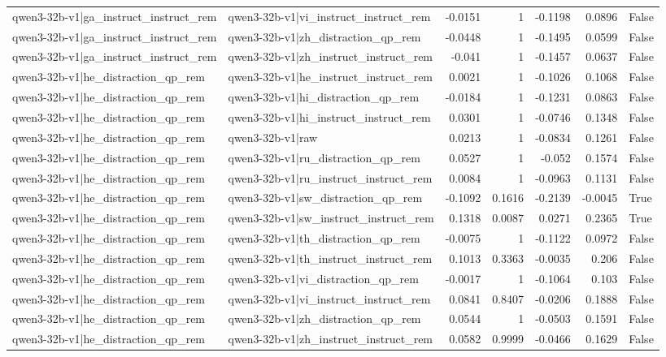 \begin{table}
\begin{tabular}{l l r r r r l}
qwen3-32b-v1|ga_instruct_instruct_rem & qwen3-32b-v1|vi_instruct_instruct_rem & -0.0151 & 1 & -0.1198 & 0.0896 & False \\
qwen3-32b-v1|ga_instruct_instruct_rem & qwen3-32b-v1|zh_distraction_qp_rem & -0.0448 & 1 & -0.1495 & 0.0599 & False \\
qwen3-32b-v1|ga_instruct_instruct_rem & qwen3-32b-v1|zh_instruct_instruct_rem & -0.041 & 1 & -0.1457 & 0.0637 & False \\
qwen3-32b-v1|he_distraction_qp_rem & qwen3-32b-v1|he_instruct_instruct_rem & 0.0021 & 1 & -0.1026 & 0.1068 & False \\
qwen3-32b-v1|he_distraction_qp_rem & qwen3-32b-v1|hi_distraction_qp_rem & -0.0184 & 1 & -0.1231 & 0.0863 & False \\
qwen3-32b-v1|he_distraction_qp_rem & qwen3-32b-v1|hi_instruct_instruct_rem & 0.0301 & 1 & -0.0746 & 0.1348 & False \\
qwen3-32b-v1|he_distraction_qp_rem & qwen3-32b-v1|raw & 0.0213 & 1 & -0.0834 & 0.1261 & False \\
qwen3-32b-v1|he_distraction_qp_rem & qwen3-32b-v1|ru_distraction_qp_rem & 0.0527 & 1 & -0.052 & 0.1574 & False \\
qwen3-32b-v1|he_distraction_qp_rem & qwen3-32b-v1|ru_instruct_instruct_rem & 0.0084 & 1 & -0.0963 & 0.1131 & False \\
qwen3-32b-v1|he_distraction_qp_rem & qwen3-32b-v1|sw_distraction_qp_rem & -0.1092 & 0.1616 & -0.2139 & -0.0045 & True \\
qwen3-32b-v1|he_distraction_qp_rem & qwen3-32b-v1|sw_instruct_instruct_rem & 0.1318 & 0.0087 & 0.0271 & 0.2365 & True \\
qwen3-32b-v1|he_distraction_qp_rem & qwen3-32b-v1|th_distraction_qp_rem & -0.0075 & 1 & -0.1122 & 0.0972 & False \\
qwen3-32b-v1|he_distraction_qp_rem & qwen3-32b-v1|th_instruct_instruct_rem & 0.1013 & 0.3363 & -0.0035 & 0.206 & False \\
qwen3-32b-v1|he_distraction_qp_rem & qwen3-32b-v1|vi_distraction_qp_rem & -0.0017 & 1 & -0.1064 & 0.103 & False \\
qwen3-32b-v1|he_distraction_qp_rem & qwen3-32b-v1|vi_instruct_instruct_rem & 0.0841 & 0.8407 & -0.0206 & 0.1888 & False \\
qwen3-32b-v1|he_distraction_qp_rem & qwen3-32b-v1|zh_distraction_qp_rem & 0.0544 & 1 & -0.0503 & 0.1591 & False \\
qwen3-32b-v1|he_distraction_qp_rem & qwen3-32b-v1|zh_instruct_instruct_rem & 0.0582 & 0.9999 & -0.0466 & 0.1629 & False \\

\end{tabular}
\end{table}
